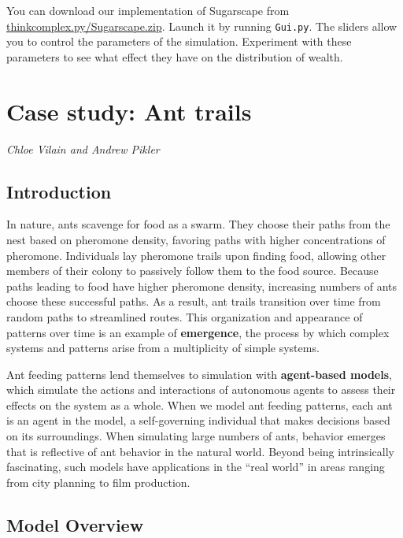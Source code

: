 \documentclass[10pt]{book}
\begin{document}
\begin{exercise}

You can download our implementation of Sugarscape from
\url{thinkcomplex.py/Sugarscape.zip}.  Launch it by running
{\tt Gui.py}.  The sliders allow you to control the parameters
of the simulation.  Experiment with these parameters to see what
effect they have on the distribution of wealth.

\end{exercise}


\chapter{Case study: Ant trails}

{\em Chloe Vilain and Andrew Pikler}

\section{Introduction}

In nature, ants scavenge for food as a swarm. They choose their paths
from the nest based on pheromone density, favoring paths with higher
concentrations of pheromone.  Individuals lay pheromone trails upon
finding food, allowing other members of their colony to passively
follow them to the food source.  Because paths leading to food have
higher pheromone density, increasing numbers of ants choose these
successful paths.  As a result, ant trails transition over time from
random paths to streamlined routes.  This organization and appearance
of patterns over time is an example of \textbf{emergence}, the process
by which complex systems and patterns arise from a multiplicity of
simple systems.

Ant feeding patterns lend themselves to simulation with
\textbf{agent-based models}, which simulate the actions and
interactions of autonomous agents to assess their effects on the
system as a whole.  When we model ant feeding patterns, each ant is an
agent in the model, a self-governing individual that makes decisions
based on its surroundings.  When simulating large numbers of ants,
behavior emerges that is reflective of ant behavior in the natural
world.  Beyond being intrinsically fascinating, such models have
applications in the ``real world'' in areas ranging from city planning
to film production.

\section{Model Overview}
\end{document}
